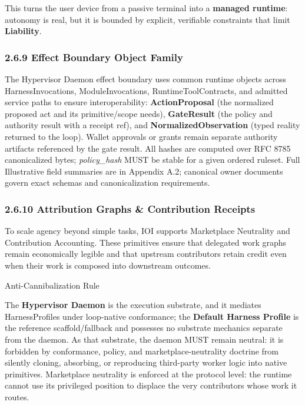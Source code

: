 \documentclass[
  11pt,
]{article}
\begin{document}
This turns the user device from a passive terminal into a
\textbf{managed runtime}: autonomy is real, but it is bounded by
explicit, verifiable constraints that limit \textbf{Liability}.

\hypertarget{normative-schema-firewall-artifacts}{%
\subsubsection{2.6.9 Effect Boundary Object
Family}\label{normative-schema-firewall-artifacts}}

The Hypervisor Daemon effect boundary uses common runtime objects across
HarnessInvocations, ModuleInvocations, RuntimeToolContracts, and admitted
service paths to ensure interoperability:
\textbf{ActionProposal} (the normalized proposed
act and its primitive/scope needs), \textbf{GateResult} (the policy and
authority result with a receipt ref), and \textbf{NormalizedObservation}
(typed reality returned to the loop). Wallet approvals or grants remain
separate authority artifacts referenced by the gate result.
All hashes are computed over RFC 8785 canonicalized bytes;
\emph{policy\_hash} MUST be stable for a given ordered ruleset. Full
Illustrative field summaries are in Appendix A.2; canonical owner documents
govern exact schemas and canonicalization requirements.

\hypertarget{attribution-graphs-contribution-receipts}{%
\subsubsection{\texorpdfstring{2.6.10 \textbf{Attribution} Graphs \&
Contribution
Receipts}{2.6.10 Attribution Graphs \& Contribution Receipts}}\label{attribution-graphs-contribution-receipts}}

To scale agency beyond simple tasks, IOI supports Marketplace Neutrality
and Contribution Accounting. These primitives ensure that delegated work
graphs remain economically legible and that upstream contributors retain
credit even when their work is composed into downstream outcomes.

Anti-Cannibalization Rule

The \textbf{Hypervisor Daemon} is the execution substrate, and it
mediates HarnessProfiles under loop-native conformance; the
\textbf{Default Harness Profile} is the reference scaffold/fallback and
possesses no substrate mechanics separate from the daemon. As that
substrate, the daemon MUST remain neutral: it is forbidden by
conformance, policy, and marketplace-neutrality doctrine from silently
cloning, absorbing, or reproducing third-party worker logic into native
primitives. Marketplace neutrality is enforced at the protocol level:
the runtime cannot use its privileged position to displace the very
contributors whose work it routes.
\end{document}
